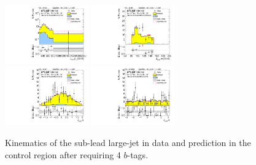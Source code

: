\begin{figure}[htbp!]
\begin{center}
\includegraphics[width=0.32\textwidth,angle=-90]{figures/boosted/Control/b77_FourTag_Control_sublHCand_Pt_m_1.pdf}
\includegraphics[width=0.32\textwidth,angle=-90]{figures/boosted/Control/b77_FourTag_Control_sublHCand_Mass_s.pdf}\\
\includegraphics[width=0.32\textwidth,angle=-90]{figures/boosted/Control/b77_FourTag_Control_sublHCand_Eta.pdf}
\includegraphics[width=0.32\textwidth,angle=-90]{figures/boosted/Control/b77_FourTag_Control_sublHCand_Phi.pdf}
  \caption{Kinematics of the sub-lead large-\R jet in data and prediction in the control region after requiring 4 $b$-tags. }
  \label{fig:boosted-4b-control-ak10-subl}
\end{center}
\end{figure}


